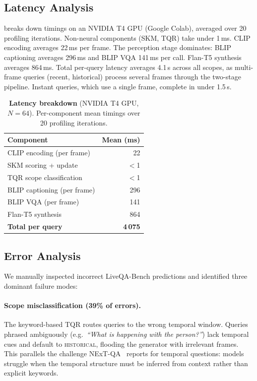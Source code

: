 \subsection{Latency Analysis}
\label{sec:latency}

 breaks down timings on an NVIDIA T4 GPU (Google Colab), averaged over 20 profiling iterations.
Non-neural components (SKM, TQR) take under 1\,ms.
CLIP encoding averages 22\,ms per frame.
The perception stage dominates: BLIP captioning averages 296\,ms and BLIP VQA 141\,ms per call.
Flan-T5 synthesis averages 864\,ms.
Total per-query latency averages 4.1\,s across all scopes, as multi-frame queries (recent, historical) process several frames through the two-stage pipeline. Instant queries, which use a single frame, complete in under 1.5\,s.

\begin{table}[t]
  \caption{\textbf{Latency breakdown} (NVIDIA T4 GPU, $N\!=\!64$). Per-component mean timings over 20 profiling iterations.}
  \label{tab:latency}
  \centering
  \small
  \begin{tabular}{@{}lr@{}}
    \toprule
    Component & Mean (ms) \\
    \midrule
    CLIP encoding (per frame)       & 22 \\
    SKM scoring + update            & $<$1 \\
    TQR scope classification        & $<$1 \\
    BLIP captioning (per frame)     & 296 \\
    BLIP VQA (per frame)            & 141 \\
    Flan-T5 synthesis               & 864 \\
    \midrule
    \textbf{Total per query}        & \textbf{4\,075} \\
    \bottomrule
  \end{tabular}
\end{table}


\subsection{Error Analysis}
\label{sec:error_analysis}

We manually inspected incorrect LiveQA-Bench predictions and identified three dominant failure modes:

\paragraph{Scope misclassification (39\% of errors).}
The keyword-based TQR routes queries to the wrong temporal window.
Queries phrased ambiguously (e.g.\ \emph{``What is happening with the person?''}) lack temporal cues and default to \textsc{historical}, flooding the generator with irrelevant frames.
This parallels the challenge NExT-QA~\cite{xiao2021nextqa} reports for temporal questions: models struggle when the temporal structure must be inferred from context rather than explicit keywords.

